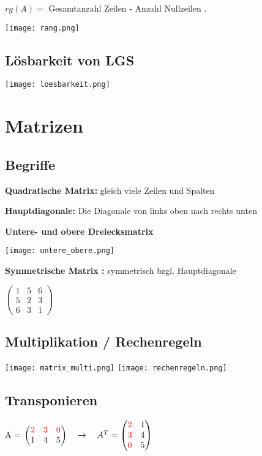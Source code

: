 \begin{multicols*}{3}
    {$rg(A) = $ Gesamtanzahl Zeilen - Anzahl Nullzeilen .}

    \texttt{[image: rang.png]}

    \subsection{Lösbarkeit von LGS}

    \texttt{[image: loesbarkeit.png]}

    \section{Matrizen}
    \subsection{Begriffe}

    \textbf{Quadratische Matrix:} gleich viele Zeilen und Spalten

    \textbf{Hauptdiagonale:} Die Diagonale von links oben nach rechts unten

    \textbf{Untere- und obere Dreiecksmatrix}

    \texttt{[image: untere\_obere.png]}

    \textbf{Symmetrische Matrix :} symmetrisch bzgl. Hauptdiagonale

    $ \begin{pmatrix}
            1 & 5 & 6 \\
            5 & 2 & 3 \\
            6 & 3 & 1
        \end{pmatrix} $

    \WhiteSpace
    \subsection{Multiplikation / Rechenregeln}
    {\begin{multicols}{2}
            { \texttt{[image: matrix\_multi.png]} }
            \columnbreak
            { \texttt{[image: rechenregeln.png]} }
        \end{multicols}}

    \subsection{Transponieren}

    A = $\begin{pmatrix} {\color{red}2} & {\color{red}3} & {\color{red}0} \\ 1 & 4 & 5 \end{pmatrix} \quad 
    \rightarrow 
    \quad A^{T} = \begin{pmatrix} {\color{red}2} & 1 \\ {\color{red}3} & 4 \\ {\color{red}0} & 5 \end{pmatrix}
    $


\end{multicols*}
